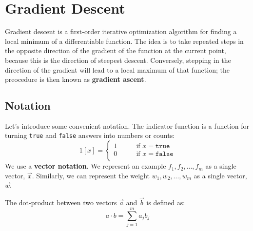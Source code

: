 \chapter{Gradient Descent}

Gradient descent is a first-order iterative optimization algorithm for finding a local minimum of a differentiable function. The idea is to take repeated steps in the opposite direction of the gradient of the function at the current point, because this is the direction of steepest descent. Conversely, stepping in the direction of the gradient will lead to a local maximum of that function; the preocedure is then known as \textbf{gradient ascent}.

\section{Notation}
Let's introduce some convenient notation. The indicator function is a function for turning \texttt{true} and \texttt{false} answers into numbers or counts:
\begin{equation}
    1[x] = \begin{cases}
        1\qquad &\text{if }x=\texttt{true}\\
        0\qquad &\text{if }x=\texttt{false}\\
    \end{cases}
\end{equation}
We use a \textbf{vector notation}. We represent an example \(f_1,f_2,...,f_m\) as a single vector, \(\vec{x}\). Similarly, we can represent the weight \(w_1,w_2,...,w_m\) as a single vector, \(\vec{w}\).

The dot-product between two vectors \(\vec{a}\) and \(\vec{b}\) is defined as:
\begin{equation}
    a \cdot b = \sum_{j=1}^m a_jb_j
\end{equation}

